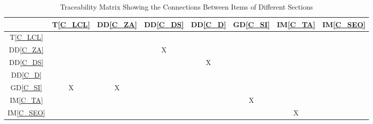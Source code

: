 \documentclass[12pt]{article}
\newcommand{\dref}[1]{GD\ref{#1}}
\newcommand{\ddref}[1]{DD\ref{#1}}
\newcommand{\tref}[1]{T\ref{#1}}
\newcommand{\iref}[1]{IM\ref{#1}}
\begin{document}
\begin{table}[h!]
\centering
\begin{tabular}{|c|c|c|c|c|c|c|c|}
\hline        
& \tref{C_LCL}& \ddref{C_ZA} & \ddref{C_DS}&\ddref{C_D} & \dref{C_SI}
&\iref{C_TA} &\iref{C_SEO} \\
\hline
\tref{C_LCL}        &    &    &     &    &    &    &     \\ \hline
\ddref{C_ZA}       &    &    & X  &    &    &    &      \\ \hline
\ddref{C_DS}       &    &    &     & X &    &    &     \\ \hline
\ddref{C_D}         &    &    &     &    &    &    &     \\ \hline
\dref{C_SI}          & X & X &     &    &    &    &       \\ \hline
\iref{C_TA}          &    &     &     &    & X &    &      \\ \hline
\iref{C_SEO}       &    &     &     &    &    & X &        \\ \hline


\hline
\end{tabular}
\caption{Traceability Matrix Showing the Connections Between Items of Different
Sections}
\label{Table:trace}
\end{table}
\end{document}
